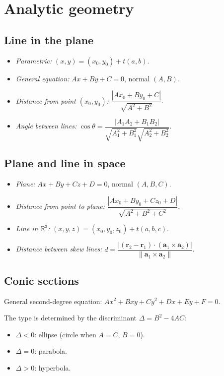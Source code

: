 \section{Analytic geometry}
\label{sec:analytic-geometry}

\subsection{Line in the plane}
\label{subsec:line-plane}

\begin{itemize}
\item \textit{Parametric:} $(x,y) = (x_0,y_0) + t(a,b)$.
\item \textit{General equation:} $Ax+By+C=0$, normal $(A,B)$.
\item \textit{Distance from point $(x_0,y_0)$:} $\dfrac{|Ax_0+By_0+C|}{\sqrt{A^2+B^2}}$.
\item \textit{Angle between lines:} $\cos\theta = \dfrac{|A_1A_2+B_1B_2|}{\sqrt{A_1^2+B_1^2}\sqrt{A_2^2+B_2^2}}$.
\end{itemize}

\subsection{Plane and line in space}
\label{subsec:plane-line-space}

\begin{itemize}
\item \textit{Plane:} $Ax+By+Cz+D=0$, normal $(A,B,C)$.
\item \textit{Distance from point to plane:} $\dfrac{|Ax_0+By_0+Cz_0+D|}{\sqrt{A^2+B^2+C^2}}$.
\item \textit{Line in $\mathbb{R}^3$:} $(x,y,z) = (x_0,y_0,z_0) + t(a,b,c)$.
\item \textit{Distance between skew lines:} $d = \dfrac{|(\mathbf{r}_2-\mathbf{r}_1)\cdot(\mathbf{a}_1\times\mathbf{a}_2)|}{\|\mathbf{a}_1\times\mathbf{a}_2\|}$.
\end{itemize}

\subsection{Conic sections}
\label{subsec:conics}

General second-degree equation: $Ax^2+Bxy+Cy^2+Dx+Ey+F=0$.

The type is determined by the discriminant $\Delta = B^2-4AC$:
\begin{itemize}
\item $\Delta<0$: ellipse (circle when $A=C$, $B=0$).
\item $\Delta=0$: parabola.
\item $\Delta>0$: hyperbola.
\end{itemize}

